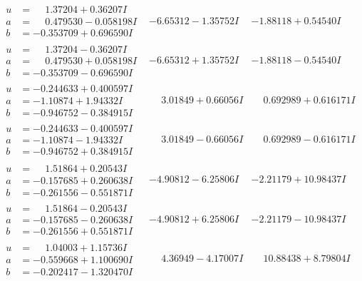 \documentclass[1p]{elsarticle_modified}
\theoremstyle{definition}
\begin{document}
$$\begin{array}{c|c|c}
\begin{aligned}
u &= \phantom{-}1.37204 + 0.36207 I \\
a &= \phantom{-}0.479530 - 0.058198 I \\
b &= -0.353709 + 0.696590 I\end{aligned}
 & -6.65312 - 1.35752 I & -1.88118 + 0.54540 I \\ \hline\begin{aligned}
u &= \phantom{-}1.37204 - 0.36207 I \\
a &= \phantom{-}0.479530 + 0.058198 I \\
b &= -0.353709 - 0.696590 I\end{aligned}
 & -6.65312 + 1.35752 I & -1.88118 - 0.54540 I \\ \hline\begin{aligned}
u &= -0.244633 + 0.400597 I \\
a &= -1.10874 + 1.94332 I \\
b &= -0.946752 - 0.384915 I\end{aligned}
 & \phantom{-}3.01849 + 0.66056 I & \phantom{-}0.692989 + 0.616171 I \\ \hline\begin{aligned}
u &= -0.244633 - 0.400597 I \\
a &= -1.10874 - 1.94332 I \\
b &= -0.946752 + 0.384915 I\end{aligned}
 & \phantom{-}3.01849 - 0.66056 I & \phantom{-}0.692989 - 0.616171 I \\ \hline\begin{aligned}
u &= \phantom{-}1.51864 + 0.20543 I \\
a &= -0.157685 + 0.260638 I \\
b &= -0.261556 - 0.551871 I\end{aligned}
 & -4.90812 - 6.25806 I & -2.21179 + 10.98437 I \\ \hline\begin{aligned}
u &= \phantom{-}1.51864 - 0.20543 I \\
a &= -0.157685 - 0.260638 I \\
b &= -0.261556 + 0.551871 I\end{aligned}
 & -4.90812 + 6.25806 I & -2.21179 - 10.98437 I \\ \hline\begin{aligned}
u &= \phantom{-}1.04003 + 1.15736 I \\
a &= -0.559668 + 1.100690 I \\
b &= -0.202417 - 1.320470 I\end{aligned}
 & \phantom{-}4.36949 - 4.17007 I & \phantom{-}10.88438 + 8.79804 I \\ \hline\begin{aligned}

\end{aligned}
\end{array}$$
\end{document}
